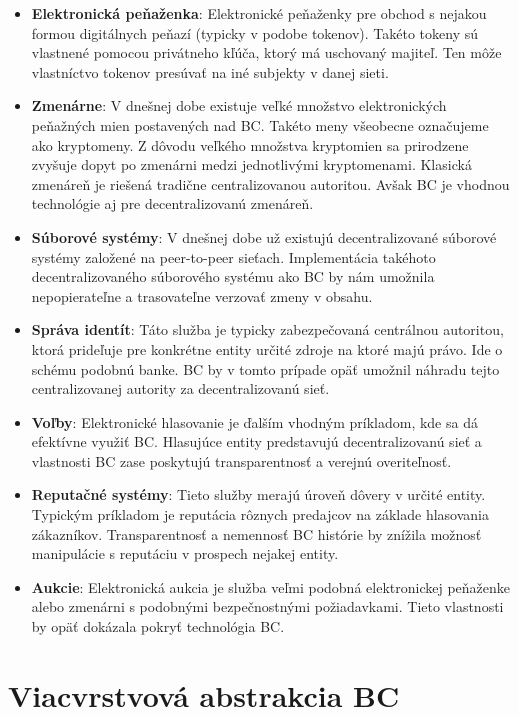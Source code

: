 \begin{itemize}
	\item \textbf{Elektronická peňaženka}: Elektronické peňaženky pre obchod s nejakou formou digitálnych peňazí (typicky v podobe tokenov). Takéto tokeny sú vlastnené pomocou privátneho kľúča, ktorý má uschovaný majiteľ. Ten môže vlastníctvo tokenov presúvať na iné subjekty v danej sieti.
	\item \textbf{Zmenárne}: V dnešnej dobe existuje veľké množstvo elektronických peňažných mien postavených nad BC. Takéto meny všeobecne označujeme ako kryptomeny. Z dôvodu veľkého množstva kryptomien sa prirodzene zvyšuje dopyt po zmenárni medzi jednotlivými kryptomenami. Klasická zmenáreň je riešená tradične centralizovanou autoritou. Avšak BC je vhodnou technológie aj pre decentralizovanú zmenáreň.
	\item \textbf{Súborové systémy}: V dnešnej dobe už existujú decentralizované súborové systémy založené na peer-to-peer sieťach. Implementácia takéhoto decentralizovaného súborového systému ako BC by nám umožnila nepopierateľne a trasovateľne verzovať zmeny v obsahu.
	\item \textbf{Správa identít}: Táto služba je typicky zabezpečovaná centrálnou autoritou, ktorá prideľuje pre konkrétne entity určité zdroje na ktoré majú právo. Ide o schému podobnú banke. BC by v tomto prípade opäť umožnil náhradu tejto centralizovanej autority za decentralizovanú sieť.
	\item \textbf{Voľby}: Elektronické hlasovanie je ďalším vhodným príkladom, kde sa dá efektívne využiť BC. Hlasujúce entity predstavujú decentralizovanú sieť a vlastnosti BC zase poskytujú transparentnosť a verejnú overiteľnosť.
	\item \textbf{Reputačné systémy}: Tieto služby merajú úroveň dôvery v určité entity. Typickým príkladom je reputácia rôznych predajcov na základe hlasovania zákazníkov. Transparentnosť a nemennosť BC histórie by znížila možnosť manipulácie s reputáciu v prospech nejakej entity.
	\item \textbf{Aukcie}: Elektronická aukcia je služba veľmi podobná elektronickej peňaženke alebo zmenárni s podobnými bezpečnostnými požiadavkami. Tieto vlastnosti by opäť dokázala pokryť technológia BC.
\end{itemize}

\section{Viacvrstvová abstrakcia BC}

